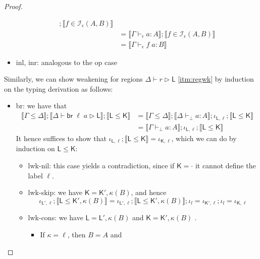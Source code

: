 \documentclass[acmsmall,screen,review]{acmart}
\newcommand{\mc}[1]{\ensuremath{\mathcal{#1}}}
\newcommand{\ms}[1]{\ensuremath{\mathsf{#1}}}
\newcommand{\brb}[2]{\ms{br}\;#1\;#2}
\newcommand{\hasty}[4]{#1 \vdash_{#2} #3: {#4}}
\newcommand{\haslb}[3]{#1 \vdash #2 \rhd #3}
\newcommand{\isop}[4]{#1 \in \mc{I}_{#4}(#2, #3)}
\newcommand{\brle}[1]{{\textsf{#1}}}
\newcommand{\dnt}[1]{\llbracket{#1}\rrbracket}
\begin{document}
\begin{proof}
\begin{itemize}
\begin{equation}
\begin{aligned}
          ; \dnt{\isop{f}{A}{B}{\epsilon}} \\
        & = \dnt{\hasty{\Gamma}{\epsilon}{a}{A}} 
          ; \dnt{\isop{f}{A}{B}{\epsilon}} \\
        & = \dnt{\hasty{\Gamma}{\epsilon}{f\;a}{B}}
      \end{aligned}
    \end{equation}
    \item \brle{inl}, \brle{inr}: analogous to the \brle{op} case
  \end{itemize}
  Similarly, we can show weakening for regions $\haslb{\Delta}{r}{\ms{L}}$ \ref{itm:regwk} by
  induction on the typing derivation as follows:
  \begin{itemize}
    \item \brle{br}: we have that
    \begin{equation}
      \begin{aligned}
      \dnt{\Gamma \leq \Delta}
        ; \dnt{\haslb{\Delta}{\brb{\ell}{a}}{\ms{L}}}
        ; \dnt{\ms{L} \leq \ms{K}}
      & = \dnt{\Gamma \leq \Delta} 
        ; \dnt{\hasty{\Delta}{\bot}{a}{A}}
        ; \iota_{\ms{L}, \ell}
        ; \dnt{\ms{L} \leq \ms{K}} \\
      & = \dnt{\hasty{\Gamma}{\bot}{a}{A}}
        ; \iota_{\ms{L}, \ell}
        ; \dnt{\ms{L} \leq \ms{K}}
      \end{aligned}
    \end{equation}
    It hence suffices to show that 
    $\iota_{\ms{L}, \ell} ; \dnt{\ms{L} \leq \ms{K}} = \iota_{\ms{K}, \ell}$, which we can do by
    induction on $\ms{L} \leq \ms{K}$:
    \begin{itemize}
      \item \brle{lwk-nil}: this case yields a contradiction, since if $\ms{K} = \cdot$ it cannot
      define the label $\ell$.
      \item \brle{lwk-skip}: we have $\ms{K} = \ms{K}', \kappa(B)$, and hence
      \begin{equation}
        \iota_{\ms{L}', \ell} ; \dnt{\ms{L} \leq \ms{K}', \kappa(B)}
        = \iota_{\ms{L}', \ell} ; \dnt{\ms{L} \leq \ms{K}', \kappa(B)} ; \iota_l
        = \iota_{\ms{K}', \ell} ; \iota_l
        = \iota_{\ms{K}, \ell}
      \end{equation}
      \item \brle{lwk-cons}: we have $\ms{L} = \ms{L}', \kappa(B)$ and $\ms{K} = \ms{K}', \kappa(B)$
      .
      \begin{itemize}
        \item If $\kappa = \ell$, then $B = A$ and

\end{itemize}
\end{itemize}
\end{itemize}
\end{proof}
\end{document}
